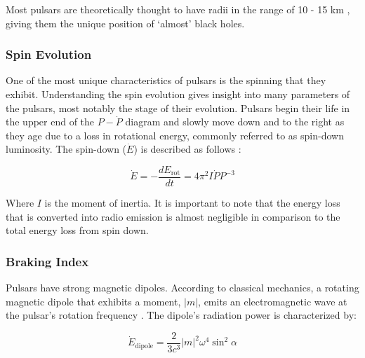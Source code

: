 Most pulsars are theoretically thought to have radii in the range of 10 - 15 km \citep{lattimer_neutron_2001}, giving them the unique position of `almost' black holes. 

\subsubsection{Spin Evolution}
One of the most unique characteristics of pulsars is the spinning that they exhibit. Understanding the spin evolution gives insight into many parameters of the pulsars, most notably the stage of their evolution. Pulsars begin their life in the upper end of the $P-\dot P$ diagram and slowly move down and to the right as they age due to a loss in rotational energy, commonly referred to as spin-down luminosity. The spin-down ($\dot E$) is described as follows \citep[p.~59]{pulsar_handbook}:

\begin{equation}
\dot E = - \frac{dE_{\text{rot}}}{dt} = 4\pi^2 I \dot P P^{-3}
\label{eq:spin-down-energy}
\end{equation}

Where $I$ is the moment of inertia. It is important to note that the energy loss that is converted into radio emission is almost negligible in comparison to the total energy loss from spin down. 




\subsubsection{Braking Index}

Pulsars have strong magnetic dipoles. According to classical mechanics, a rotating magnetic dipole that exhibits a moment, $|m|$, emits an electromagnetic wave at the pulsar's rotation frequency \citep[p.~60]{pulsar_handbook}. The dipole's radiation power is characterized by:

\begin{equation}
    \dot E_{\text{dipole}} = \frac{2}{3c^3} |m|^2 \omega^4 \sin^2 \alpha
\end{equation}

